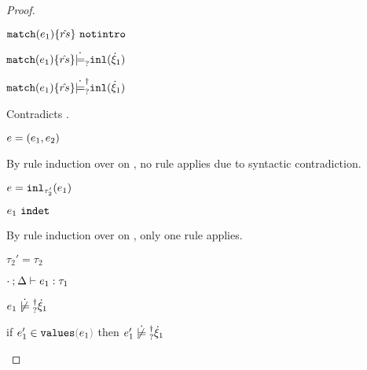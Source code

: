 \begin{proof}
\begin{byCases}
\begin{byCases}
\begin{byCases}
\begin{pfsteps*}
          \item $\mathtt{match}(e_1) \{\hat{rs}\} ~\mathtt{notintro}$  
          \item $\mathtt{match}(e_1) \{\hat{rs}\} \dot{\models}_{?} \mathtt{inl}(\dot{\xi}_1)$  
          \item $\mathtt{match}(e_1) \{\hat{rs}\} \dot{\models}_{?}^{\dag} \mathtt{inl}(\dot{\xi}_1)$ 
          \end{pfsteps*} 
          Contradicts .
          \item[\text{(\ref{rule:IPairL}), (\ref{rule:IPairR}), (\ref{rule:IPair})}] 
          \begin{pfsteps*}
          \item $e=(e_1 , e_2)$ 
          \end{pfsteps*} 
          By rule induction over  on , no rule applies due to syntactic contradiction.
          \item[\text{(\ref{rule:IInl})}] 
          \begin{pfsteps*}
          \item $e=\mathtt{inl}_{\tau_2'}({e_1})$ 
          \item $e_1 ~\mathtt{indet}$  
          \end{pfsteps*} 
          By rule induction over  on , only one rule applies.
          \begin{byCases}
            \item[\text{(\ref{rule:TInl})}]
            \begin{pfsteps*}
            \item $\tau_2'=\tau_2$ 
            \item $\cdot \mathbin{;} \Delta \vdash e_1 : \tau_1$  
            \item $\cnotsatisfyormay{e_1}{\hxi_1}$  
            \item if $\inValues{e_1'}{e_1}$ then $\cnotsatisfyormay{e_1'}{\hxi_1}$  
            \end{pfsteps*} 

\end{byCases}
\end{byCases}
\end{byCases}
\end{byCases}
\end{proof}
